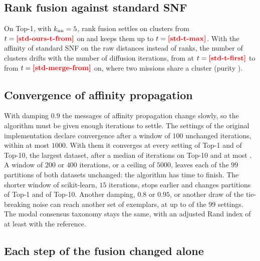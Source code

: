 \begin{table}[!htbp]
\centering
\caption{Fusion architectures on Top-1 (same distances, same clustering, $99$ settings).
\emph{Modal}: settings at the modal count $\Cstar$; \emph{perfect}: settings with purity and ARI equal to
one; $C\le2$: settings where the partition collapses; \emph{monotone}: neighborhood sizes for which
$C$ never increases with $t$.}
\label{tab:designs}
\end{table}


\subsection{Rank fusion against standard SNF}
On Top-1, with $k_{\mathrm{nn}}=5$, rank fusion settles on  clusters from $t=\nm{std-ours-t-from}$ on and
keeps them up to $t=\nm{std-t-max}$. With the affinity of standard SNF on the raw distances instead of ranks, the
number of clusters drifts with the number of diffusion iterations, from  at
$t=\nm{std-t-first}$ to  from $t=\nm{std-merge-from}$ on, where two missions share a cluster
(purity ).

\subsection{Convergence of affinity propagation}
With damping $0.9$ the messages of affinity propagation change slowly, so the algorithm must be
given enough iterations to settle. The settings of the original implementation declare convergence
after a window of $100$ unchanged iterations, within at most $1000$. With them it converges at every
setting of Top-1 and of Top-10, the largest dataset, after a median of 
iterations on Top-10 and at most . A window of $200$ or $400$ iterations, or a ceiling of $5000$, leaves
each of the $99$ partitions of both datasets unchanged: the algorithm has time to finish. The
shorter window of scikit-learn, $15$ iterations, stops earlier and changes 
partitions of Top-1 and  of Top-10. Another damping, $0.8$ or $0.95$, or
another draw of the tie-breaking noise can reach another set of exemplars, at up to
 of the $99$ settings. The modal consensus taxonomy stays the same,
with an adjusted Rand index of at least  with the reference.

\subsection{Each step of the fusion changed alone}
\begin{table}[!htbp]
\centering
\caption{Each step of the fusion changed alone, on the ten datasets, the taxonomy of every variant
built on its own modal region, as for the method. \emph{Modal} and \emph{stability}: means over the datasets, without
labels. \emph{Purity} and \emph{ARI}: means over the datasets. \emph{Misassigned}: runs outside a
cluster dominated by their mission, summed over the datasets.}
\label{tab:variants}
\end{table}


